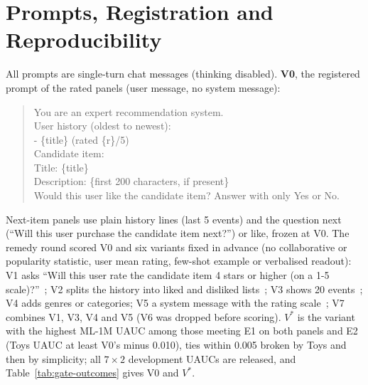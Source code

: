 \section{Prompts, Registration and Reproducibility}\label{app:prompts}\label{app:sensitivity}\label{app:deviations}
All prompts are single-turn chat messages (thinking disabled). \textbf{V0}, the registered prompt of the rated panels (user
message, no system message):
\begin{quote}\ttfamily\scriptsize\raggedright
You are an expert recommendation system.\\[1pt]
User history (oldest to newest):\\
- \{title\} (rated \{r\}/5) \\[1pt]
Candidate item:\\
Title: \{title\}\\
Description: \{first 200 characters, if present\}\\[1pt]
Would this user like the candidate item? Answer with only Yes or No.
\end{quote}
Next-item panels use plain history lines (last 5 events) and the question \textsf{next} (``Will this user purchase the candidate
item next?'') or \textsf{like}, frozen at V0. The remedy round scored V0 and six variants fixed in advance (no collaborative or
popularity statistic, user mean rating, few-shot example or verbalised readout): V1 asks ``Will this user rate the candidate item 4
stars or higher (on a 1-5 scale)?''~\citep{kang2023llmrating}; V2 splits the history into liked and disliked
lists~\citep{bao2023tallrec}; V3 shows 20 events~\citep{lin2024rella}; V4 adds genres or categories; V5 a system message with the
rating scale~\citep{kang2023llmrating}; V7 combines V1, V3, V4 and V5 (V6 was dropped before scoring). $V^\ast$ is the variant with the
highest ML-1M UAUC among those meeting E1 on both panels and E2 (Toys UAUC at least V0's minus 0.010), ties within 0.005 broken by
Toys and then by simplicity; all $7\times2$ development UAUCs are released, and Table~\ref{tab:gate-outcomes} gives V0 and $V^\ast$.

